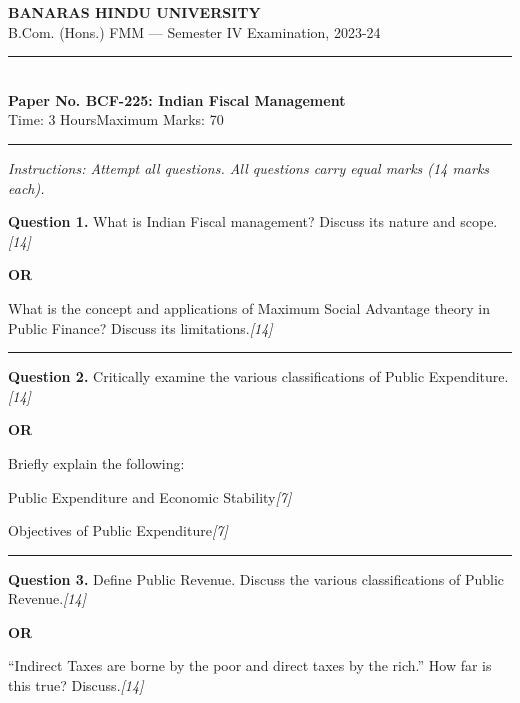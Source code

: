 \documentclass[11pt,a4paper]{article}
\newcommand{\pts}[1]{\hfill   \textit{[#1]}}
\begin{document}
\begin{center}
  {\large\bfseries BANARAS HINDU UNIVERSITY}\\[2pt]
  {\normalsize B.Com. (Hons.) FMM --- Semester IV Examination, 2023-24}\\[6pt]
  \rule{0.8\linewidth}{0.5pt}\\[6pt]
  {\large\bfseries Paper No. BCF-225: Indian Fiscal Management}\\[4pt]
  {\normalsize Time: 3 Hours\hfill Maximum Marks: 70}
\end{center}

\rule{\linewidth}{0.4pt}

\smallskip



\noindent   \textit{Instructions: Attempt all questions. All questions carry equal marks (14 marks each).}

\bigskip




\noindent   \textbf{Question 1.}
What is Indian Fiscal management? Discuss its nature and scope.\pts{14}

\centerline{   \textbf{OR}}

What is the concept and applications of Maximum Social Advantage theory in Public Finance? Discuss its limitations.\pts{14}

\medskip\rule{\linewidth}{0.2pt}




\noindent   \textbf{Question 2.}
Critically examine the various classifications of Public Expenditure.\pts{14}

\centerline{   \textbf{OR}}

Briefly explain the following:

\begin{parts}
  \item Public Expenditure and Economic Stability\pts{7}
  \item Objectives of Public Expenditure\pts{7}
\end{parts}

\medskip\rule{\linewidth}{0.2pt}




\noindent   \textbf{Question 3.}
Define Public Revenue. Discuss the various classifications of Public Revenue.\pts{14}

\centerline{   \textbf{OR}}

``Indirect Taxes are borne by the poor and direct taxes by the rich.'' How far is this true? Discuss.\pts{14}
\end{document}

